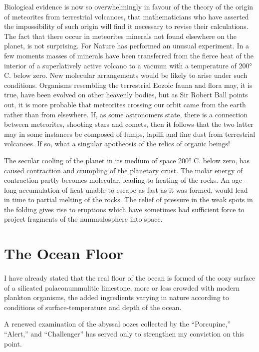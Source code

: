 \documentclass[a4paper, 12pt, oneside]{article}
\begin{document}
Biological evidence is now so overwhelmingly in favour of the theory of the origin of meteorites from terrestrial volcanoes, that mathematicians who have asserted the impossibility of such origin will find it necessary to revise their calculations. The fact that there occur in meteorites minerals not found elsewhere on the planet, is not surprising. For Nature has performed an unusual experiment. In a few moments masses of minerals have been transferred from the fierce heat of the interior of a superlatively active volcano to a vacuum with a temperature of 200° C. below zero. New molecular arrangements would be likely to arise under such conditions. Organisms resembling the terrestrial Eozoic fauna and flora may, it is true, have been evolved on other heavenly bodies, but as Sir Robert Ball points out, it is more probable that meteorites crossing our orbit came from the earth rather than from elsewhere. If, as some astronomers state, there is a connection between meteorites, shooting stars and comets, then it follows that the two latter may in some instances be composed of lumps, lapilli and fine dust from terrestrial volcanoes. If so, what a singular apotheosis of the relics of organic beings!

The secular cooling of the planet in its medium of space 200° C. below zero, has caused contraction and crumpling of the planetary crust. The molar energy of contraction partly becomes molecular, leading to heating of the rocks. An age-long accumulation of heat unable to escape as fast as it was formed, would lead in time to partial melting of the rocks. The relief of pressure in the weak spots in the folding gives rise to eruptions which have sometimes had sufficient force to project fragments of the nummulosphere into space.
\clearpage
\section{The Ocean Floor}
\paragraph{}
I have already stated that the real floor of the ocean is formed of the oozy surface of a silicated palaeonummulitic limestone, more or less crowded with modern plankton organisms, the added ingredients varying in nature according to conditions of surface-temperature and depth of the ocean.

A renewed examination of the abyssal oozes collected by the ``Porcupine,'' ``Alert,'' and ``Challenger'' has served only to strengthen my conviction on this point.
\end{document}
